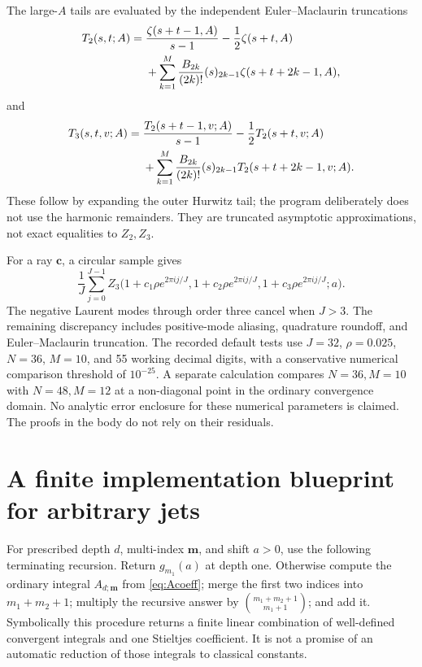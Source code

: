 \documentclass[11pt,a4paper]{article}
\numberwithin{equation}{section}
\theoremstyle{definition}\newtheorem{definition}[theorem]{Definition}
\theoremstyle{remark}\newtheorem{remark}[theorem]{Remark}
\begin{document}
The large-$A$ tails are evaluated by the independent Euler--Maclaurin
truncations
\begin{align}\label{eq:EM2}
 T_2(s,t;A)={}&\frac{\zeta(s+t-1,A)}{s-1}
       -\frac12\zeta(s+t,A)\notag\\
 &+\sum_{k=1}^{M}\frac{B_{2k}}{(2k)!}(s)_{2k-1}
                      \zeta(s+t+2k-1,A),
\end{align}
and
\begin{align}\label{eq:EM3}
 T_3(s,t,v;A)={}&\frac{T_2(s+t-1,v;A)}{s-1}
       -\frac12T_2(s+t,v;A)\notag\\
 &+\sum_{k=1}^{M}\frac{B_{2k}}{(2k)!}(s)_{2k-1}
                      T_2(s+t+2k-1,v;A).
\end{align}
These follow by expanding the outer Hurwitz tail; the program deliberately
does not use the harmonic remainders. They are truncated asymptotic
approximations, not exact equalities to $Z_2,Z_3$.

For a ray $\bm c$, a circular sample gives
\[
 \frac1J\sum_{j=0}^{J-1}
 Z_3\bigl(1+c_1\rho e^{2\pi i j/J},
          1+c_2\rho e^{2\pi i j/J},
          1+c_3\rho e^{2\pi i j/J};a\bigr).
\]
The negative Laurent modes through order three cancel when $J>3$.
The remaining discrepancy includes positive-mode aliasing, quadrature
roundoff, and Euler--Maclaurin truncation. The recorded default tests use
$J=32$, $\rho=0.025$, $N=36$, $M=10$, and 55 working decimal digits,
with a conservative numerical comparison threshold of $10^{-25}$.
A separate calculation compares $N=36,M=10$ with $N=48,M=12$ at a
non-diagonal point in the ordinary convergence domain. No analytic
error enclosure for these numerical parameters is claimed. The proofs
in the body do not rely on their residuals.

\section{A finite implementation blueprint for arbitrary jets}
\label{app:algorithm}

For prescribed depth $d$, multi-index $\bm m$, and shift $a>0$, use the
following terminating recursion. Return $g_{m_1}(a)$ at depth one.
Otherwise compute the ordinary integral $A_{d;\bm m}$ from
\eqref{eq:Acoeff}; merge the first two indices into
$m_1+m_2+1$; multiply the recursive answer by
$\binom{m_1+m_2+1}{m_1+1}$; and add it. Symbolically this procedure
returns a finite linear combination of well-defined convergent
integrals and one Stieltjes coefficient. It is not a promise of an
automatic reduction of those integrals to classical constants.
\end{document}
